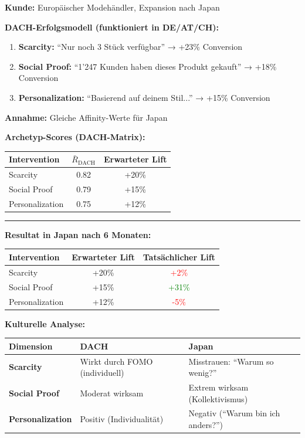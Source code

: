 \begin{tcolorbox}[colback=red!3!white, colframe=red!60!black,
    title=\textbf{Case Study 6: Der Retailer und die japanische Expansion}]

\textbf{Kunde:} Europäischer Modehändler, Expansion nach Japan

\textbf{DACH-Erfolgsmodell (funktioniert in DE/AT/CH):}
\begin{enumerate}[nosep]
    \item \textbf{Scarcity:} ``Nur noch 3 Stück verfügbar'' → +23\% Conversion
    \item \textbf{Social Proof:} ``1'247 Kunden haben dieses Produkt gekauft'' → +18\% Conversion
    \item \textbf{Personalization:} ``Basierend auf deinem Stil...'' → +15\% Conversion
\end{enumerate}

\textbf{Annahme:} Gleiche Affinity-Werte für Japan

\textbf{Archetyp-Scores (DACH-Matrix):}
\begin{center}
\begin{tabular}{@{}lcc@{}}
\toprule
\textbf{Intervention} & $\bar{R}_{\text{DACH}}$ & \textbf{Erwarteter Lift} \\
\midrule
Scarcity & 0.82 & +20\% \\
Social Proof & 0.79 & +15\% \\
Personalization & 0.75 & +12\% \\
\bottomrule
\end{tabular}
\end{center}

\medskip
\hrule
\medskip

\textbf{Resultat in Japan nach 6 Monaten:}
\begin{center}
\begin{tabular}{@{}lcc@{}}
\toprule
\textbf{Intervention} & \textbf{Erwarteter Lift} & \textbf{Tatsächlicher Lift} \\
\midrule
Scarcity & +20\% & \textcolor{red}{+2\%} \\
Social Proof & +15\% & \textcolor{green}{+31\%} \\
Personalization & +12\% & \textcolor{red}{-5\%} \\
\bottomrule
\end{tabular}
\end{center}

\textbf{Kulturelle Analyse:}

\renewcommand{\arraystretch}{1.2}
\begin{center}
\begin{tabular}{@{}p{2.5cm}p{4cm}p{4cm}@{}}
\toprule
\textbf{Dimension} & \textbf{DACH} & \textbf{Japan} \\
\midrule
\textbf{Scarcity} & Wirkt durch FOMO (individuell) & Misstrauen: ``Warum so wenig?'' \\
\textbf{Social Proof} & Moderat wirksam & Extrem wirksam (Kollektivismus) \\
\textbf{Personalization} & Positiv (Individualität) & Negativ (``Warum bin ich anders?'') \\
\bottomrule
\end{tabular}
\end{center}


\end{tcolorbox}
